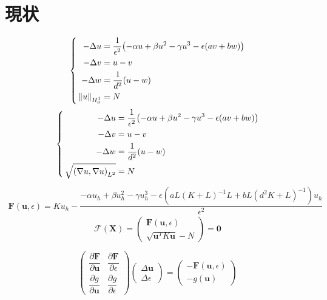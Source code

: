 \documentclass[a4paper, 11pt]{ltjsreport}
\theoremstyle{plain}
\theoremstyle{definition}
\begin{document}
\chapter{現状}
\begin{equation}
  \left\{ \,
      \begin{aligned}
          -\Delta u &= \frac{1}{\epsilon^2}\qty(-\alpha u +\beta u^2 -\gamma u^3 -\epsilon\qty(a v + b w ))\\
          -\Delta v &= u-v \\
          -\Delta w &= \frac{1}{d^2}\qty(u-w)\\
          \norm{u}_{H^1_0} &= N
      \end{aligned}
  \right.
\end{equation}
\begin{equation}
  \left\{ \,
      \begin{aligned}
          -\Delta u &= \frac{1}{\epsilon^2}\qty(-\alpha u +\beta u^2 -\gamma u^3 -\epsilon\qty(a v + b w ))\\
          -\Delta v &= u-v \\
          -\Delta w &= \frac{1}{d^2}\qty(u-w)\\
          \sqrt{\qty(\nabla u,\nabla u)_{L^2} } &= N
      \end{aligned}
  \right.
\end{equation}
\begin{align}
   \bm{F}(\bm{u},\epsilon) =Ku_h- \dfrac{-\alpha u_h + \beta  u_h^2 -\gamma  u_h^3-\epsilon(aL(K+L)^{-1}L+bL(d^2K+L)^{-1}) u_h}{\epsilon^2}
\end{align}
\begin{equation}
    \bm{\mathcal{F}}(\bm{X}) = 
    \begin{pmatrix}
        \bm{F}(\bm{u}, \epsilon) \\
        \sqrt{\bm{u}^T K \bm{u}} - N
    \end{pmatrix}
    = \bm{0}
\end{equation}

\newpage
\begin{equation}
    \begin{pmatrix}
        \dfrac{\partial \bm{F}}{\partial \bm{u}} & \dfrac{\partial \bm{F}}{\partial \epsilon} \\[10pt]
        \dfrac{\partial g}{\partial \bm{u}} & \dfrac{\partial g}{\partial \epsilon}
    \end{pmatrix}
    \begin{pmatrix}
        \Delta \bm{u} \\
        \Delta \epsilon
    \end{pmatrix}
    =
    \begin{pmatrix}
        -\bm{F}(\bm{u}, \epsilon) \\
        -g(\bm{u})
    \end{pmatrix}
\end{equation}
\end{document}

